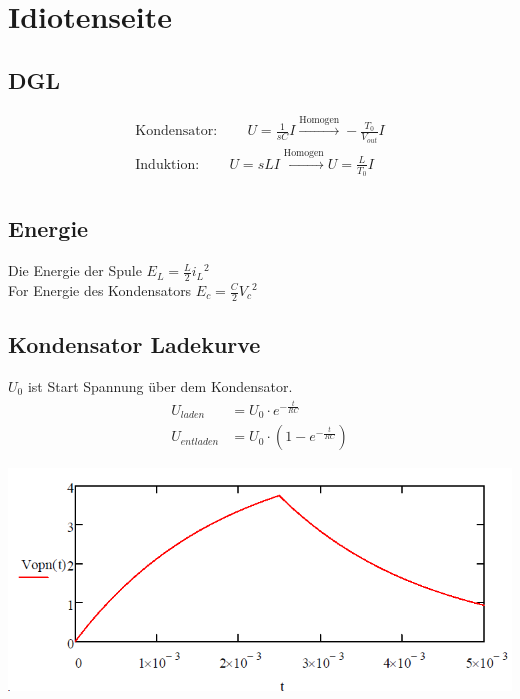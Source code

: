 \section{Idiotenseite}

\subsection{DGL}
\begin{align*}
	\text{Kondensator}: \qquad U = \frac{1}{s C}I \xrightarrow{\text{Homogen}}  -\frac{T_0}{V_{out}}I\\
	\text{Induktion}: \qquad U = s L I \xrightarrow{\text{Homogen}} U = \frac{L}{T_0}I\\
\end{align*}

\subsection{Energie}
Die Energie der Spule $E_L = \frac{L}{2} {i_L}^2$~\\
For Energie des Kondensators $E_c = \frac{C}{2}{V_c}^2$

\subsection{Kondensator Ladekurve}
$U_0$ ist Start Spannung über dem Kondensator.
\begin{align*}
	U_{laden} &= U_0\cdot e^{-\frac{t}{RC}} \\
	U_{entladen} &= U_0\cdot \left(1- e^{-\frac{t}{RC}}\right)
\end{align*}
\begin{center}
	\includegraphics[width=0.5\columnwidth]{Images/kondi}
\end{center}
